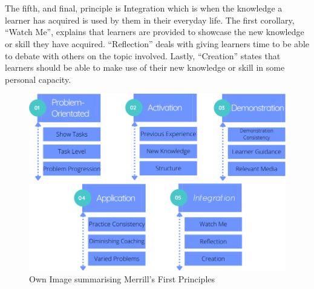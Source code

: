 \documentclass[conference]{IEEEtran}
\begin{document}
\\\\
The fifth, and final, principle is Integration which is when the knowledge a learner has acquired is used by them in their everyday life\cite{Merrill2002}. The first corollary, “Watch Me”, explains that learners are provided to showcase the new knowledge or skill they have acquired\cite{Merrill2002}. “Reflection” deals with giving learners time to be able to debate with others on the topic involved\cite{Merrill2002}. Lastly, “Creation” states that learners should be able to make use of their new knowledge or skill in some personal capacity\cite{Merrill2002}.

\begin{figure}[htbp]
\centerline{\includegraphics[scale=0.37]{merrill2.png}}
\caption{Own Image summarising Merrill's First Principles}
\label{fig}
\end{figure}
\end{document}
